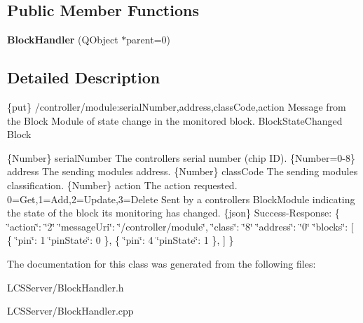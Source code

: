 \subsection*{Public Member Functions}
\begin{DoxyCompactItemize}
\item 
\mbox{\label{class_block_handler_a47dd8ca4a026321dc6401f2589c28980}} 
{\bfseries Block\+Handler} (Q\+Object $\ast$parent=0)
\end{DoxyCompactItemize}


\subsection{Detailed Description}
\{put\} /controller/module\+:serial\+Number,address,class\+Code,action Message from the Block Module of state change in the monitored block.  Block\+State\+Changed  Block

\{Number\} serial\+Number The controller\textquotesingle{}s serial number (chip ID).  \{Number=0-\/8\} address The sending module\textquotesingle{}s address.  \{Number\} class\+Code The sending module\textquotesingle{}s classification.  \{Number\} action The action requested. 0=Get,1=Add,2=Update,3=Delete  Sent by a controller\textquotesingle{}s Block\+Module indicating the state of the block it\textquotesingle{}s monitoring has changed.  \{json\} Success-\/\+Response\+: \{ \char`\"{}action\char`\"{}\+: \char`\"{}2\char`\"{} \char`\"{}message\+Uri\char`\"{}\+: \char`\"{}/controller/module\char`\"{}, \char`\"{}class\char`\"{}\+: \char`\"{}8\char`\"{} \char`\"{}address\char`\"{}\+: \char`\"{}0\char`\"{} \char`\"{}blocks\char`\"{}\+: \mbox{[} \{ \char`\"{}pin\char`\"{}\+: 1 \char`\"{}pin\+State\char`\"{}\+: 0 \}, \{ \char`\"{}pin\char`\"{}\+: 4 \char`\"{}pin\+State\char`\"{}\+: 1 \}, \mbox{]} \} 

The documentation for this class was generated from the following files\+:\begin{DoxyCompactItemize}
\item 
L\+C\+S\+Server/Block\+Handler.\+h\item 
L\+C\+S\+Server/Block\+Handler.\+cpp\end{DoxyCompactItemize}
